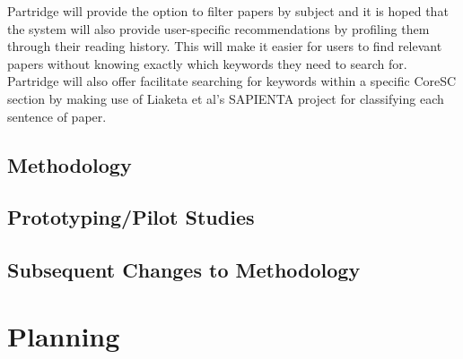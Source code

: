 \documentclass[12pt,a4paper]{article}
\begin{document}
Partridge will provide the option to filter papers by subject and it is hoped
that the system will also provide user-specific recommendations by profiling
them through their reading history. This will make it easier for users to find
relevant papers without knowing exactly which keywords they need to search for.
Partridge will also offer facilitate searching for keywords within a specific
CoreSC section by making use of Liaketa et al's SAPIENTA project for
classifying each sentence of paper. 


\subsection{Methodology}

\subsection{Prototyping/Pilot Studies}

\subsection{Subsequent Changes to Methodology}

\section{Planning}

\pagebreak


\end{document}
